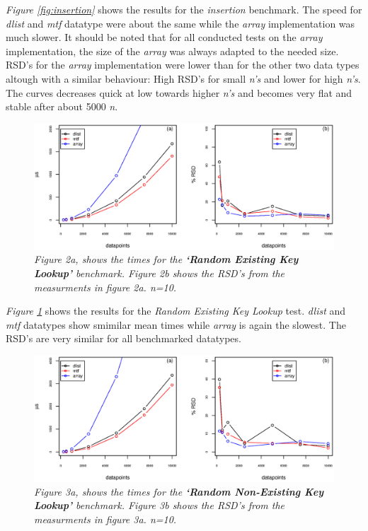 \documentclass[a4paper,11pt,twoside]{article}
\begin{document}
\textit{Figure \ref{fig:insertion}} shows the results for the
\emph{insertion} benchmark. The speed for \emph{dlist} and \emph{mtf} datatype were
about the same while the \emph{array} implementation was much slower. It
should be noted that for all conducted tests on the \emph{array}
implementation, the size of the \emph{array} was always adapted to the
needed size. RSD's for the \emph{array} implementation were lower than for
the other two data types altough with a similar behaviour: High RSD's 
for small \textit{n's} and lower for high \textit{n's}. The curves
decreases quick at low towards higher \textit{n's} and becomes very
flat and stable after about 5000 \textit{n}.

\begin{figure}[H] 
\centering 
\includegraphics[width=\textwidth]{figures/fig2.eps}
\caption{\textit{Figure 2a, shows the times for the \textbf{`Random Existing
    Key Lookup'} benchmark. Figure 2b shows the RSD's from the measurments
in figure 2a. n=10.}}
\label{fig:randexlook}
\end{figure}

\textit{Figure \ref{fig:randexlook}} shows the results for the \emph{Random
Existing Key Lookup} test. \emph{dlist} and \emph{mtf} datatypes show smimilar
mean times while \emph{array} is again the slowest. The RSD's are very
similar for all benchmarked datatypes.

\begin{figure}[H] 
\centering 
\includegraphics[width=\textwidth]{figures/fig3.eps}
\caption{\textit{Figure 3a, shows the times for the \textbf{`Random
      Non-Existing Key Lookup'} benchmark. Figure 3b shows the RSD's from
    the measurments in figure 3a. n=10.}}
\label{fig:randnonexlook}
\end{figure}
\end{document}
